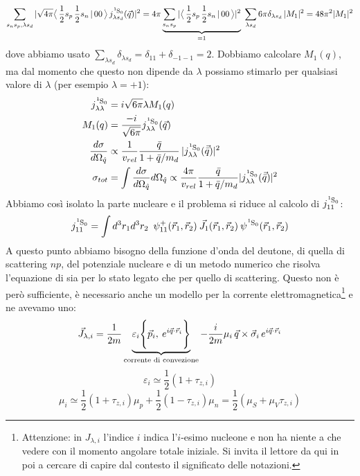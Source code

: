 $$\sum_{s_ns_p,\lambda s_d}|\sqrt{4\pi} \clebs{\frac{1}{2}s_p\,\frac{1}{2}s_n}{00}\, j^{\ce{^1S_0}}_{\lambda s_d} (\vec{q})|^2 = 4\pi \underbrace{\sum_{s_ns_p}|\clebs{\frac{1}{2}s_p\,\frac{1}{2}s_n}{00}|^2}_{=1} \; \sum_{\lambda s_d} 6\pi \delta_{\lambda s_d}\,|M_1|^2 = 48\pi^2 |M_1|^2$$
dove abbiamo usato $\sum_{\lambda s_d}\delta_{\lambda s_d}=\delta_{11} + \delta_{-1-1} =2$. Dobbiamo calcolare $M_1(q)$, ma dal momento che questo non dipende da $\lambda$ possiamo stimarlo per qualsiasi valore di $\lambda$ (per esempio $\lambda = +1$):
\begin{displaymath}
\begin{aligned}
j^{\ce{^1S_0}}_{\lambda\lambda} &= i \sqrt{6\pi} \lambda M_1(q)\\
M_1(q) &= \frac{-i}{\sqrt{6\pi}} j^{\ce{^1S_0}}_{\lambda\lambda} (\vec{q}) \\
\frac{d\sigma}{d\Omega_{\hat{q}}} &\propto \frac{1}{v_{rel}} \frac{\bar{q}}{1+\bar{q}/m_d} \, |j^{\ce{^1S_0}}_{\lambda\lambda}(\vec{\bar{q}})|^2 \\
\sigma_{tot} &= \int \frac{d\sigma}{d\Omega_{\hat{q}}} d\Omega_{\hat{q}} \propto \frac{4\pi}{v_{rel}} \frac{\bar{q}}{1+\bar{q}/m_d} |j^{\ce{^1S_0}}_{\lambda\lambda}(\vec{\bar{q}})|^2
\end{aligned}
\end{displaymath}
Abbiamo così isolato la parte nucleare e il problema si riduce al calcolo di $j^{\ce{^1S_0}}_{11}$:
$$j^{\ce{^1S_0}}_{11} = \int d^3r_1 d^3r_2 \;\: \psi_{11}^+(\vec{r}_1,\vec{r}_2)\: \vec{J}_1(\vec{r}_1,\vec{r}_2)\:\psi^{\ce{^1S_0}}(\vec{r}_1,\vec{r}_2)$$
A questo punto abbiamo bisogno della funzione d'onda del deutone, di quella di scattering $np$, del potenziale nucleare e di un metodo numerico che risolva l'equazione di \Sch{} sia per lo stato legato che per quello di scattering. Questo non è però sufficiente, è necessario anche un modello per la corrente elettromagnetica\footnote{Attenzione: in $J_{\lambda,i}$ l'indice $i$ indica l'$i$-esimo nucleone e non ha niente a che vedere con il momento angolare totale iniziale. Si invita il lettore da qui in poi a cercare di capire dal contesto il significato delle notazioni.} e ne avevamo uno:
$$\vec{J}_{\lambda,i} = \frac{1}{2m} \underbrace{\varepsilon_i \Biggl \{ \vec{p}_i,\:e^{i\vec{q}\cdot\vec{r}_i} \Biggr \}}_\text{corrente di convezione} - \frac{i}{2m} \mu_i \, \vec{q}\times \vec{\sigma}_i\, e^{i\vec{q}\cdot\vec{r}_i}$$
$$\varepsilon_i \simeq \frac{1}{2}(1+\tau_{z,i})$$
$$\mu_i \simeq \frac{1}{2}(1+\tau_{z,i})\mu_p + \frac{1}{2}(1-\tau_{z,i})\mu_n = \frac{1}{2} (\mu_S +\mu_V \tau_{z,i}) $$
